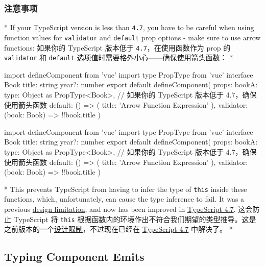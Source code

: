 \begin{paracol}{2}
\subsubsection{注意事项}
\switchcolumn[0]*%
If your TypeScript version is less than \texttt{4.7}, you have to be
careful when using function values for \texttt{validator} and
\texttt{default} prop options - make sure to use arrow functions:
\switchcolumn
如果你的 TypeScript 版本低于 \texttt{4.7}，在使用函数作为 prop 的
\texttt{validator} 和 \texttt{default}
选项值时需要格外小心------确保使用箭头函数：
\switchcolumn[0]*%
\begin{codeTs}
import { defineComponent } from 'vue'
import type { PropType } from 'vue'
interface Book {
  title: string
  year?: number
}
export default defineComponent({
  props: {
    bookA: {
      type: Object as PropType<Book>,
      // 如果你的 TypeScript 版本低于 4.7，确保使用箭头函数
      default: () => ({
        title: 'Arrow Function Expression'
      }),
      validator: (book: Book) => !!book.title
    }
  }
})
\end{codeTs}
\switchcolumn
\begin{codeTs}
import { defineComponent } from 'vue'
import type { PropType } from 'vue'
interface Book {
  title: string
  year?: number
}
export default defineComponent({
  props: {
    bookA: {
      type: Object as PropType<Book>,
      // 如果你的 TypeScript 版本低于 4.7，确保使用箭头函数
      default: () => ({
        title: 'Arrow Function Expression'
      }),
      validator: (book: Book) => !!book.title
    }
  }
})
\end{codeTs}
\switchcolumn[0]*%
This prevents TypeScript from having to infer the type of \texttt{this}
inside these functions, which, unfortunately, can cause the type
inference to fail. It was a previous
\href{https://github.com/microsoft/TypeScript/issues/38845}{design
limitation}, and now has been improved in
\href{https://www.typescriptlang.org/docs/handbook/release-notes/typescript-4-7.html\#improved-function-inference-in-objects-and-methods}{TypeScript
4.7}.
\switchcolumn
这会防止 TypeScript 将 \texttt{this}
根据函数内的环境作出不符合我们期望的类型推导。这是之前版本的一个\href{https://github.com/microsoft/TypeScript/issues/38845}{设计限制}，不过现在已经在
\href{https://www.typescriptlang.org/docs/handbook/release-notes/typescript-4-7.html\#improved-function-inference-in-objects-and-methods}{TypeScript
4.7} 中解决了。
\switchcolumn[0]*%
\subsection{Typing Component Emits}
\switchcolumn

\end{paracol}
